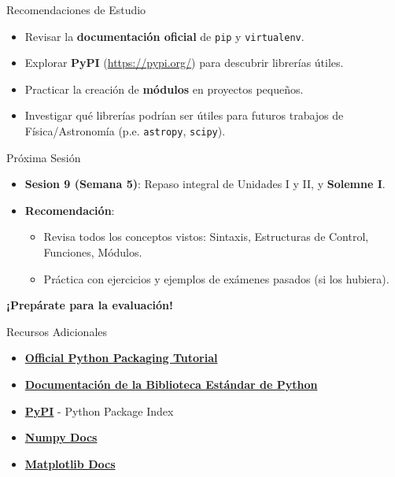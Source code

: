 \documentclass[10pt]{beamer}
\begin{document}
\begin{frame}{Recomendaciones de Estudio}
  \begin{itemize}
    \item Revisar la \textbf{documentación oficial} de \texttt{pip} y \texttt{virtualenv}.
    \item Explorar \textbf{PyPI} (\url{https://pypi.org/}) para descubrir librerías útiles.
    \item Practicar la creación de \textbf{módulos} en proyectos pequeños.
    \item Investigar qué librerías podrían ser útiles para futuros trabajos de Física/Astronomía (p.e. \texttt{astropy}, \texttt{scipy}).
  \end{itemize}
\end{frame}

\begin{frame}{Próxima Sesión}
  \begin{itemize}
    \item \textbf{Sesion 9 (Semana 5)}: Repaso integral de Unidades I y II, y \textbf{Solemne I}.
    \item \textbf{Recomendación}:
      \begin{itemize}
        \item Revisa todos los conceptos vistos: Sintaxis, Estructuras de Control, Funciones, Módulos.
        \item Práctica con ejercicios y ejemplos de exámenes pasados (si los hubiera).
      \end{itemize}
  \end{itemize}
  \vspace{0.3cm}
  \textbf{¡Prepárate para la evaluación!}
\end{frame}

\begin{frame}{Recursos Adicionales}
  \begin{itemize}
    \item \href{https://packaging.python.org/tutorials/installing-packages/}{\textbf{Official Python Packaging Tutorial}}
    \item \href{https://docs.python.org/3/library/}{\textbf{Documentación de la Biblioteca Estándar de Python}}
    \item \href{https://pypi.org/}{\textbf{PyPI}} - Python Package Index
    \item \href{https://numpy.org/doc/}{\textbf{Numpy Docs}}
    \item \href{https://matplotlib.org/stable/}{\textbf{Matplotlib Docs}}
  \end{itemize}
\end{frame}
\end{document}
